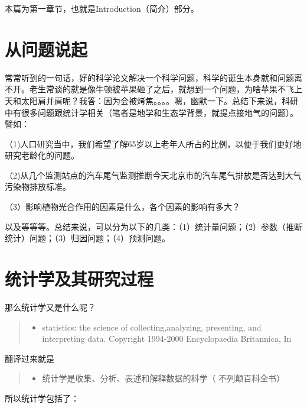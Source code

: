\documentclass[]{ctexbook}
\providecommand{\tightlist}{%
  \setlength{\itemsep}{0pt}\setlength{\parskip}{0pt}}
\begin{document}
本篇为第一章节，也就是Introduction（简介）部分。

\hypertarget{ux4eceux95eeux9898ux8bf4ux8d77}{%
\section{从问题说起}\label{ux4eceux95eeux9898ux8bf4ux8d77}}

常常听到的一句话，好的科学论文解决一个科学问题，科学的诞生本身就和问题离不开。老生常谈的就是像牛顿被苹果砸了之后，就想到一个问题，为啥苹果不飞上天和太阳肩并肩呢？我答：因为会被烤焦。。。。嗯，幽默一下。总结下来说，科研中有很多问题跟统计学相关（笔者是地学和生态学背景，就提点接地气的问题）。譬如：

（1)人口研究当中，我们希望了解65岁以上老年人所占的比例，以便于我们更好地研究老龄化的问题。

（2)从几个监测站点的汽车尾气监测推断今天北京市的汽车尾气排放是否达到大气污染物排放标准。

（3）影响植物光合作用的因素是什么，各个因素的影响有多大？

以及等等等。总结来说，可以分为以下的几类：（1）统计量问题；（2）参数（推断统计）问题；（3）归因问题；（4）预测问题。

\hypertarget{ux7edfux8ba1ux5b66ux53caux5176ux7814ux7a76ux8fc7ux7a0b}{%
\section{统计学及其研究过程}\label{ux7edfux8ba1ux5b66ux53caux5176ux7814ux7a76ux8fc7ux7a0b}}

那么统计学又是什么呢？

\begin{quote}
\begin{itemize}
\tightlist
\item
  statistics: the science of collecting,analyzing, presenting, and interpreting data.
  Copyright 1994-2000 Encyclopaedia Britannica, In
\end{itemize}
\end{quote}

翻译过来就是

\begin{quote}
\begin{itemize}
\tightlist
\item
  统计学是收集、分析、表述和解释数据的科学（ 不列颠百科全书）
\end{itemize}
\end{quote}

所以统计学包括了：
\end{document}
